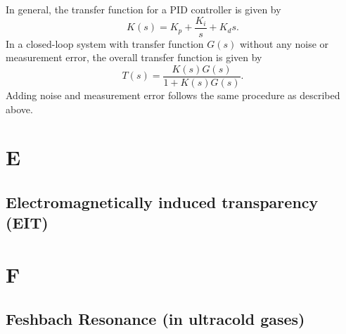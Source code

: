 \documentclass{book}
\theoremstyle{definition}
\newcommand{\f}[2]{\frac{#1}{#2}}
\begin{document}
In general, the transfer function for a PID controller is given by 
\begin{equation*}
K(s) = K_p + \f{K_i}{s} + K_d s.
\end{equation*}
In a closed-loop system with transfer function $G(s)$ without any noise or measurement error, the overall transfer function is given by 
\begin{equation*}
T(s) = \f{K(s)G(s)}{1+ K(s)G(s)}. 
\end{equation*}
Adding noise and measurement error follows the same procedure as described above. 








\chapter*{E}



\section*{Electromagnetically induced transparency (EIT)}


\chapter*{F}


\section*{Feshbach Resonance (in ultracold gases)}
\end{document}
